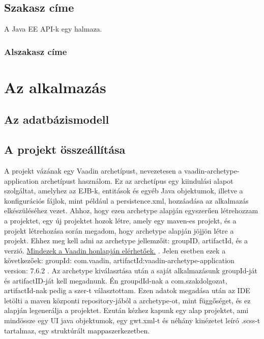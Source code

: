 \documentclass[centeredchapter]{thesis-ekf}
\theoremstyle{definition}
\theoremstyle{remark}
\begin{document}
\section{Szakasz címe}

A Java EE API-k egy halmaza.

\subsection{Alszakasz címe}

\chapter{Az alkalmazás}

\section{Az adatbázismodell}

\section{A projekt összeállítása}

A projekt vázának egy Vaadin archetípust, nevezetesen a vaadin-archetype-application archetípust használom. Ez az archetípus egy kiindulási alapot szolgáltat, amelyhez az EJB-k, entitások és egyéb Java objektumok, illetve a konfigurációs fájlok, mint például a persistence.xml, hozzáadása az alkalmazás elkészüléséhez vezet.
Ahhoz, hogy ezen archetype alapján egyszerűen létrehozzam a projektet, egy új projektet hozok létre, amely egy maven-es projekt, és a projekt létrehozása során megadom, hogy archetype alapján jöjjön létre a projekt. Ehhez meg kell adni az archetype jellemzőit: groupID, artifactId, és a verzió. \href{https://vaadin.com/maven#dependencies}{Mindezek a Vaadin honlapján elérhetőek.} . Jelen esetben ezek a következőek: groupId: com.vaadin, artifactId:vaadin-archetype-application version: 7.6.2 . Az archetype kiválasztása után a saját alkalmazásunk groupId-ját és artifactID-ját kell megadnunk. Én groupdId-nak a com.szakdolgozat, artifactId-nak pedig a szer-t választottam. Ezen adatok megadása után az IDE letölti a maven központi repository-jából a archetype-ot, mint függőséget, és ez alapján legenerálja a projektet. Ezután kézhez kapunk egy alap projektet, ami mindössze egy UI java objektumok, egy gwt.xml-t és néhány kinézetet leíró .scss-t tartalmaz, egy struktúrált mappaszerkezetben.
\end{document}
